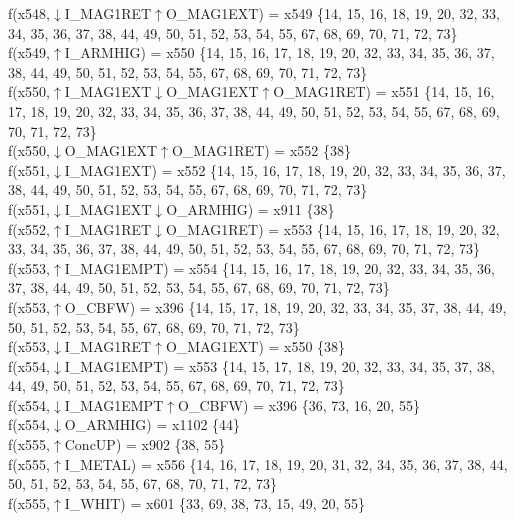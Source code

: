 f(x548,$\downarrow$I\_MAG1RET$\uparrow$O\_MAG1EXT) = x549 \{14, 15, 16, 18, 19, 20, 32, 33, 34, 35, 36, 37, 38, 44, 49, 50, 51, 52, 53, 54, 55, 67, 68, 69, 70, 71, 72, 73\} \\  
f(x549,$\uparrow$I\_ARMHIG) = x550 \{14, 15, 16, 17, 18, 19, 20, 32, 33, 34, 35, 36, 37, 38, 44, 49, 50, 51, 52, 53, 54, 55, 67, 68, 69, 70, 71, 72, 73\} \\  
f(x550,$\uparrow$I\_MAG1EXT$\downarrow$O\_MAG1EXT$\uparrow$O\_MAG1RET) = x551 \{14, 15, 16, 17, 18, 19, 20, 32, 33, 34, 35, 36, 37, 38, 44, 49, 50, 51, 52, 53, 54, 55, 67, 68, 69, 70, 71, 72, 73\} \\  
f(x550,$\downarrow$O\_MAG1EXT$\uparrow$O\_MAG1RET) = x552 \{38\} \\  
f(x551,$\downarrow$I\_MAG1EXT) = x552 \{14, 15, 16, 17, 18, 19, 20, 32, 33, 34, 35, 36, 37, 38, 44, 49, 50, 51, 52, 53, 54, 55, 67, 68, 69, 70, 71, 72, 73\} \\  
f(x551,$\downarrow$I\_MAG1EXT$\downarrow$O\_ARMHIG) = x911 \{38\} \\  
f(x552,$\uparrow$I\_MAG1RET$\downarrow$O\_MAG1RET) = x553 \{14, 15, 16, 17, 18, 19, 20, 32, 33, 34, 35, 36, 37, 38, 44, 49, 50, 51, 52, 53, 54, 55, 67, 68, 69, 70, 71, 72, 73\} \\  
f(x553,$\uparrow$I\_MAG1EMPT) = x554 \{14, 15, 16, 17, 18, 19, 20, 32, 33, 34, 35, 36, 37, 38, 44, 49, 50, 51, 52, 53, 54, 55, 67, 68, 69, 70, 71, 72, 73\} \\  
f(x553,$\uparrow$O\_CBFW) = x396 \{14, 15, 17, 18, 19, 20, 32, 33, 34, 35, 37, 38, 44, 49, 50, 51, 52, 53, 54, 55, 67, 68, 69, 70, 71, 72, 73\} \\  
f(x553,$\downarrow$I\_MAG1RET$\uparrow$O\_MAG1EXT) = x550 \{38\} \\  
f(x554,$\downarrow$I\_MAG1EMPT) = x553 \{14, 15, 17, 18, 19, 20, 32, 33, 34, 35, 37, 38, 44, 49, 50, 51, 52, 53, 54, 55, 67, 68, 69, 70, 71, 72, 73\} \\  
f(x554,$\downarrow$I\_MAG1EMPT$\uparrow$O\_CBFW) = x396 \{36, 73, 16, 20, 55\} \\  
f(x554,$\downarrow$O\_ARMHIG) = x1102 \{44\} \\  
f(x555,$\uparrow$ConcUP) = x902 \{38, 55\} \\  
f(x555,$\uparrow$I\_METAL) = x556 \{14, 16, 17, 18, 19, 20, 31, 32, 34, 35, 36, 37, 38, 44, 50, 51, 52, 53, 54, 55, 67, 68, 70, 71, 72, 73\} \\  
f(x555,$\uparrow$I\_WHIT) = x601 \{33, 69, 38, 73, 15, 49, 20, 55\} \\  
